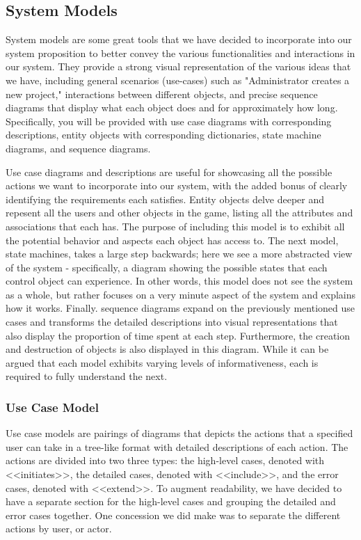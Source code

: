 \documentclass[12pt,letterpaper]{article}
\begin{document}
\subsection{System Models}

System models are some great tools that we have decided to incorporate into our system proposition to better convey the various functionalities and
interactions in our system. They provide a strong visual representation of the various ideas that we have, including general scenarios (use-cases) such as 
"Administrator creates a new project," interactions between different objects, and precise sequence diagrams that display what each object %
does and for approximately how long. Specifically, you will be provided with use case diagrams with corresponding descriptions, entity objects with corresponding  
dictionaries, state machine diagrams, and sequence diagrams. 

Use case diagrams and descriptions are useful for showcasing all the possible actions we want to incorporate into our system, with the added bonus of clearly
identifying the requirements each satisfies. Entity objects delve deeper and repesent all the users and other objects in the game, listing all the attributes and associations
that each has. The purpose of including this model is to exhibit all the potential behavior and aspects each object has access to. The next model, state machines, takes a large
step backwards; here we see a more abstracted view of the system - specifically, a diagram showing the possible states that each control object can experience. In other words, this
model does not see the system as a whole, but rather focuses on a very minute aspect of the system and explains how it works. Finally. sequence diagrams
expand on the previously mentioned use cases and transforms the detailed descriptions into visual representations that also display the proportion of time spent
at each step. Furthermore, the creation and destruction of objects is also displayed in this diagram. While it can be argued that each model exhibits varying levels
of informativeness, each is required to fully understand the next.

\subsubsection{Use Case Model}

Use case models are pairings of diagrams that depicts the actions that a specified user can take in a tree-like format with detailed descriptions of each action. The actions 
are divided into two three types: the high-level cases, denoted with <<initiates>>, the detailed cases, denoted with <<include>>, and the error cases, denoted with 
<<extend>>. To augment readability, we have decided to have a separate section for the high-level cases and grouping the detailed and error cases together. One 
concession we did make was to separate the different actions by user, or actor. 
\end{document}
